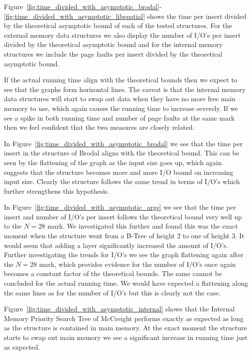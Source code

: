 \documentclass[twoside,11pt,openright]{report}
\begin{document}
Figure~\ref{fig:time_divided_with_asymptotic_brodal}-\ref{fig:time_divided_with_asymptotic_libspatial} shows the time per insert divided by the theoretical asymptotic bound of each of the tested structures. For the external memory data structures we also display the number of I/O's per insert divided by the theoretical asymptotic bound and for the internal memory structures we include the page faults per insert divided by the theoretical asymptotic bound. 

If the actual running time align with the theoretical bounds then we expect to see that the graphs form horizontal lines. The caveat is that the internal memory data structures will start to swap out data when they have no more free main memory to use, which again causes the running time to increase severely. If we see a spike in both running time and number of page faults at the same mark then we feel confident that the two measures are closely related.

In Figure~\ref{fig:time_divided_with_asymptotic_brodal} we see that the time per insert in the structure of Brodal aligns with the theoretical bound. This can be seen by the flattening of the graph as the input size goes up, which again suggests that the structure becomes more and more I/O bound on increasing input size. Clearly the structure follows the same trend in terms of I/O's which further strengthens this hypothesis.

In Figure~\ref{fig:time_divided_with_asymptotic_arge} we see that the time per insert and number of I/O's per insert follows the theoretical bound very well up to the $N = 28$ mark. We investigated this further and found this was the exact moment when the structure went from a B-Tree of height 2 to one of height 3. It would seem that adding a layer significantly increased the amount of I/O's. Further investigating the trends for I/O's we see the graph flattening again after the $N = 28$ mark, which provides evidence for the number of I/O's once again becomes a constant factor of the theoretical bounds. The same cannot be concluded for the actual running time. We would have expected a flattening along the same lines as for the number of I/O's but this is clearly not the case.

Figure~\ref{fig:time_divided_with_asymptotic_internal} shows that the Internal Memory Priority Search Tree of McCreight performs exactly as expected as long as the structure is contained in main memory. At the exact moment the structure starts to swap out main memory we see a significant increase in running time just as expected.
\end{document}
